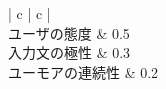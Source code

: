 \begin{table}[tb]
\begin{center}
\caption{重みづけの例2}
\label{tb:ex1weight1}
\begin{tabular}{| c | c |}
\hline
      \\\hline
	 ユーザの態度 & 0.5 \\\hline
     入力文の極性 & 0.3 \\\hline
	 ユーモアの連続性 & 0.2 \\\hline
     
\end{tabular}
\end{center}
\end{table}

